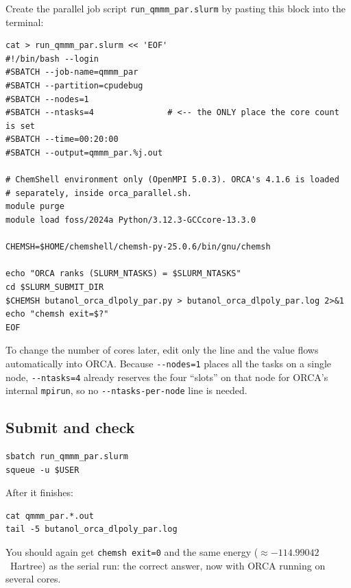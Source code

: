 \documentclass[12pt,a4paper]{article}
\begin{document}
Create the parallel job script \texttt{run\_qmmm\_par.slurm} by pasting this block
into the terminal:

\noindent %
\begin{minipage}{\linewidth}
\begin{lstlisting}[style=shell]
cat > run_qmmm_par.slurm << 'EOF'
#!/bin/bash --login
#SBATCH --job-name=qmmm_par
#SBATCH --partition=cpudebug
#SBATCH --nodes=1
#SBATCH --ntasks=4               # <-- the ONLY place the core count is set
#SBATCH --time=00:20:00
#SBATCH --output=qmmm_par.%j.out

# ChemShell environment only (OpenMPI 5.0.3). ORCA's 4.1.6 is loaded
# separately, inside orca_parallel.sh.
module purge
module load foss/2024a Python/3.12.3-GCCcore-13.3.0

CHEMSH=$HOME/chemshell/chemsh-py-25.0.6/bin/gnu/chemsh

echo "ORCA ranks (SLURM_NTASKS) = $SLURM_NTASKS"
cd $SLURM_SUBMIT_DIR
$CHEMSH butanol_orca_dlpoly_par.py > butanol_orca_dlpoly_par.log 2>&1
echo "chemsh exit=$?"
EOF
\end{lstlisting}
\end{minipage}

To change the number of cores later, edit only the  line and
the value flows automatically into ORCA. Because \texttt{-\hspace{0mm}-nodes=1} places all
the tasks on a single node, \texttt{-\hspace{0mm}-ntasks=4} already reserves the four
``slots'' on that node for ORCA's internal \texttt{mpirun}, so no
\texttt{-\hspace{0mm}-ntasks-per-node} line is needed.

\subsection{Submit and check}

\begin{lstlisting}[style=shell]
sbatch run_qmmm_par.slurm
squeue -u $USER
\end{lstlisting}

After it finishes:

\begin{lstlisting}[style=shell]
cat qmmm_par.*.out
tail -5 butanol_orca_dlpoly_par.log
\end{lstlisting}

You should again get \texttt{chemsh exit=0} and the same energy
($\approx -114.99042$~Hartree) as the serial run: the correct answer, now with ORCA
running on several cores.
\end{document}
